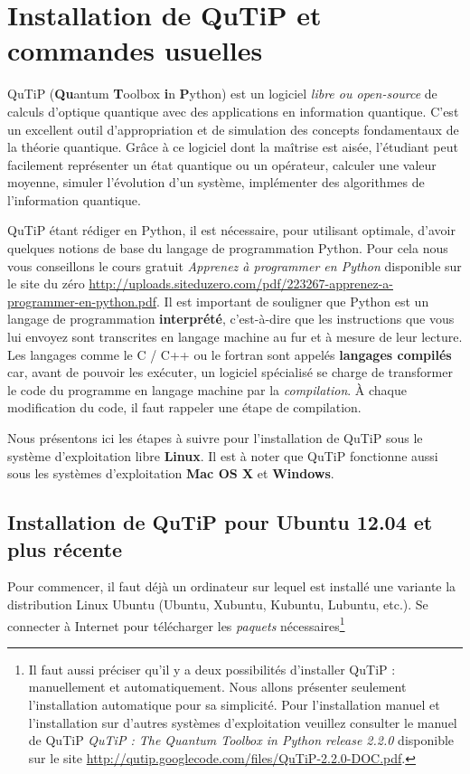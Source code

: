 
\chapter{Installation de QuTiP et commandes usuelles}
\label{sec:QuTiP}

QuTiP (\textbf{Qu}antum \textbf{T}oolbox \textbf{i}n \textbf{P}ython) est un 
logiciel \emph{libre ou open-source} de calculs d'optique quantique avec des 
applications en information quantique. C'est un excellent outil d'appropriation 
et de simulation des concepts fondamentaux de la théorie quantique. Grâce à ce 
logiciel dont la maîtrise est aisée, l'étudiant peut facilement représenter un 
état quantique ou un opérateur, calculer une valeur moyenne, simuler l'évolution 
d'un système, implémenter des algorithmes de l'information quantique.

QuTiP étant rédiger en Python, il est nécessaire, pour utilisant optimale, 
d'avoir quelques notions de base du langage de programmation Python. Pour 
cela nous vous conseillons le cours gratuit \emph{Apprenez à programmer 
en Python} disponible sur le site du zéro \url{
http://uploads.siteduzero.com/pdf/223267-apprenez-a-programmer-en-python.pdf}. 
Il est important de souligner que Python est un langage de programmation 
\textbf{interprété}, c'est-à-dire que les instructions que vous lui envoyez sont 
transcrites en langage machine au fur et à mesure de leur lecture. Les langages 
comme le C / C++ ou le fortran sont appelés \textbf{langages compilés} car, 
avant de pouvoir les exécuter, un logiciel spécialisé se charge de transformer 
le code du programme en langage machine par la \emph{compilation}. À chaque 
modification du code, il faut rappeler une étape de compilation.
 
Nous présentons ici les étapes à suivre pour l'installation de QuTiP sous le 
système d'exploitation libre \textbf{Linux}. Il est à noter que QuTiP fonctionne 
aussi sous les systèmes d'exploitation \textbf{Mac OS X} et \textbf{Windows}. 

\section{Installation de QuTiP pour Ubuntu 12.04 et plus récente}

Pour commencer, il faut déjà un ordinateur sur lequel est installé une variante 
la distribution Linux Ubuntu (Ubuntu, Xubuntu, Kubuntu, Lubuntu, etc.). Se 
connecter à Internet pour télécharger les \emph{paquets} nécessaires\footnote{Il 
faut aussi préciser qu'il y a deux possibilités d'installer QuTiP : manuellement 
et automatiquement. Nous allons présenter seulement l'installation automatique 
pour sa simplicité. Pour l'installation manuel et l'installation sur d'autres 
systèmes d'exploitation veuillez consulter le manuel de QuTiP \emph{QuTiP : The 
Quantum Toolbox in Python release 2.2.0} disponible sur le site 
\url{http://qutip.googlecode.com/files/QuTiP-2.2.0-DOC.pdf}.}

